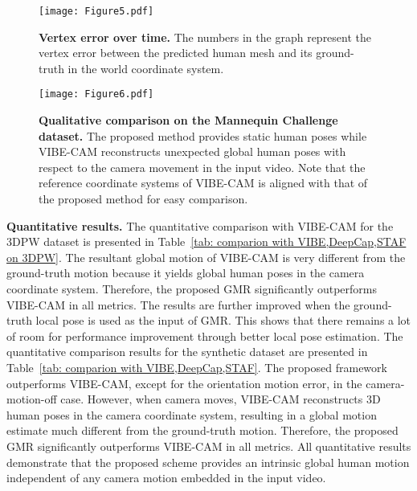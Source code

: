 \documentclass[10pt,twocolumn,letterpaper]{article}
\begin{document}
\begin{figure}[t]
\texttt{[image: Figure5.pdf]}
\vspace*{-6mm}
\caption{\textbf{Vertex error over time.} The numbers in the graph represent the vertex error between the predicted human mesh and its ground-truth in the world coordinate system.}
\label{fig5}
\vspace*{-1mm}
\end{figure}



\begin{figure*}[t]
\texttt{[image: Figure6.pdf]}
\vspace*{-6mm}
\caption{\textbf{Qualitative comparison on the Mannequin Challenge dataset.} The proposed method provides static human poses while VIBE-CAM reconstructs unexpected global human poses with respect to the camera movement in the input video. Note that the reference coordinate systems of VIBE-CAM is aligned with that of the proposed method for easy comparison.}
\label{fig6}
\vspace*{-1mm}
\end{figure*}

\textbf{Quantitative results.} The quantitative comparison with VIBE-CAM for the 3DPW dataset is presented in Table~\ref{tab: comparion with VIBE,DeepCap,STAF on 3DPW}. The resultant global motion of VIBE-CAM is very different from the ground-truth motion because it yields global human poses in the camera coordinate system. Therefore, the proposed GMR significantly outperforms VIBE-CAM in all metrics. The results are further improved when the ground-truth local pose is used as the input of GMR. This shows that there remains a lot of room for performance improvement through better local pose estimation. The quantitative comparison results for the synthetic dataset are presented in Table~\ref{tab: comparion with VIBE,DeepCap,STAF}. The proposed framework outperforms VIBE-CAM, except for the orientation motion error, in the camera-motion-off case. However, when camera moves, VIBE-CAM reconstructs 3D human poses in the camera coordinate system, resulting in a global motion estimate much different from the ground-truth motion. Therefore, the proposed GMR significantly outperforms VIBE-CAM in all metrics. All quantitative results demonstrate that the proposed scheme provides an intrinsic global human motion independent of any camera motion embedded in the input video.
\end{document}
